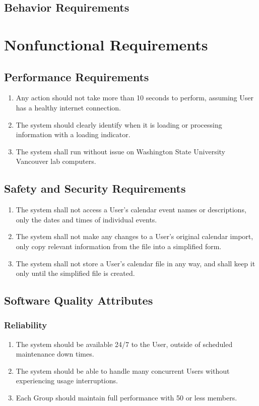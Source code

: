 \documentclass{scrreprt}
\begin{document}
\section{Behavior Requirements}


\chapter{Nonfunctional Requirements}

\section{Performance Requirements}
\begin{enumerate}
\item Any action should not take more than 10 seconds to perform, assuming User
has a healthy internet connection.
\item The system should clearly identify when it is loading or processing
information with a loading indicator.
\item The system shall run without issue on Washington State University Vancouver
lab computers.
\end{enumerate}

\section{Safety and Security Requirements}
\begin{enumerate}
\item The system shall not access a User's calendar event names or descriptions, 
only the dates and times of individual events.
\item The system shall not make any changes to a User's original calendar import,
only copy relevant information from the file into a simplified form.
\item The system shall not store a User's calendar file in any way, and shall
keep it only until the simplified file is created.
\end{enumerate}

\section{Software Quality Attributes}

\subsection{Reliability}
\begin{enumerate}
\item The system should be available 24/7 to the User, outside of scheduled maintenance
down times.
\item The system should be able to handle many concurrent Users without experiencing
usage interruptions.
\item Each Group should maintain full performance with 50 or less members. 
\end{enumerate}
\end{document}
